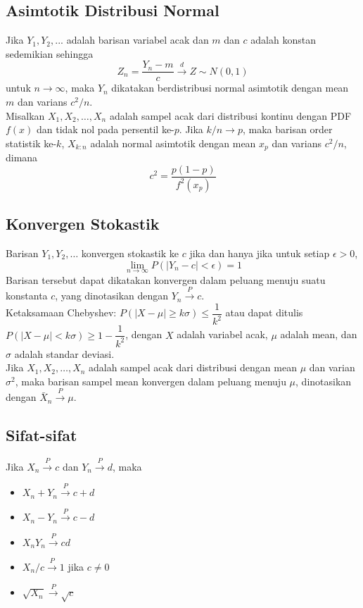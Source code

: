 \documentclass[a4paper,extrafontsizes, 9pt]{memoir}
\begin{document}
\begin{multicols}{3}
                \subsection*{\small Asimtotik Distribusi Normal}
                Jika $Y_1,Y_2,...$ adalah barisan variabel acak dan $m$ dan $c$ adalah konstan sedemikian sehingga
                \[Z_n=\dfrac{Y_n-m}{c}\xrightarrow{d}Z\sim N(0,1)\]
                untuk $n\to\infty$, maka $Y_n$ dikatakan berdistribusi normal asimtotik dengan mean $m$ dan varians $c^2/n$.\\

                Misalkan $X_1,X_2,\dots,X_n$ adalah sampel acak dari distribusi kontinu dengan PDF $f(x)$ dan tidak nol pada persentil ke-$p$. Jika $k/n\to p$, maka barisan order statistik ke-$k$, $X_{k:n}$ adalah normal asimtotik dengan mean $x_p$ dan varians $c^2/n$, dimana 
                \[c^2 = \dfrac{p(1-p)}{f^2(x_p)}\]

                \subsection*{\small Konvergen Stokastik}
                Barisan $Y_1,Y_2,\dots$ konvergen stokastik ke $c$ jika dan hanya jika untuk setiap $\epsilon>0$, 
                \[\lim_{n\to\infty}P(|Y_n-c|<\epsilon)=1\]
                Barisan tersebut dapat dikatakan konvergen dalam peluang menuju suatu konstanta $c$, yang dinotasikan dengan $Y_n\xrightarrow{P}c$.\\

                Ketaksamaan Chebyshev: $P(|X-\mu|\geq k\sigma)\leq\dfrac{1}{k^2}$ atau dapat ditulis $P(|X-\mu|< k\sigma)\geq 1-\dfrac{1}{k^2}$,
                dengan $X$ adalah variabel acak, $\mu$ adalah mean, dan $\sigma$ adalah standar deviasi.\\

                Jika $X_1,X_2,\dots,X_n$ adalah sampel acak dari distribusi dengan mean $\mu$ dan varian $\sigma^2$, maka barisan sampel mean konvergen dalam peluang menuju $\mu$, dinotasikan dengan $\bar{X}_n\xrightarrow{P}\mu$.
                \vspace*{-0.3cm}
                \subsection*{\small Sifat-sifat}
                Jika $X_n\xrightarrow{P}c$ dan $Y_n\xrightarrow{P}d$, maka
                \begin{itemize}
                    \setlength\itemsep{0.5mm}
                    \item $X_n+Y_n\xrightarrow{P}c+d$
                    \item $X_n-Y_n\xrightarrow{P}c-d$
                    \item $X_nY_n\xrightarrow{P}cd$
                    \item $X_n/c\xrightarrow{P}1$ jika $c\neq 0$
                    \item $\sqrt{X_n}\xrightarrow{P}\sqrt{c}$
                \end{itemize}

\end{multicols}
\end{document}
